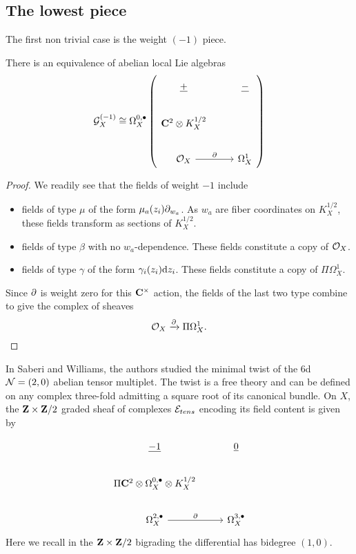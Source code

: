 \documentclass[../main.tex]{subfiles}
\begin{document}
\subsection{The lowest piece}

The first non trivial case is the weight $(-1)$ piece.

\begin{lem}
There is an equivalence of abelian local Lie algebras 
\[
\mc{G}_{X} ^{(-1)}\cong \Omega^{0,\bullet}_{X} \left ( 
\begin{tikzcd}
\ul{+} & \ul{-} \\
\C^2\otimes K^{1/2}_{X} & \\ 
\mc{O}_{X} \ar[r, "\del"] & \Omega^1_{X} 
\end{tikzcd}
\right )
\] 
\end{lem}
\begin{proof}
We readily see that the fields of weight $-1$ include
\begin{itemize}
\item 
fields of type $\mu$ of the form $\mu_a (z_i)\partial_{w_a}$. As $w_a$ are fiber coordinates on $K^{1/2}_{X}$, these fields transform as sections of $K^{1/2}_{X}$. 
\item 
fields of type $\beta$ with no $w_a$-dependence. These fields constitute a copy of $\mathcal{O}_{X}$.
\item 
fields of type $\gamma$ of the form $\gamma_i(z_i)\mathrm{d} z_i$. These fields constitute a copy of $\Pi \Omega^1_{X}$. 
\end{itemize}
Since $\partial$ is weight zero for this $\mathbf{C}^\times$ action, the fields of the last two type combine to give the complex of sheaves
\[
\mathcal{O}_{X}  \xrightarrow{\partial} \Pi \Omega^{1}_{X}  .
\]

\end{proof}

\parsec[]
In \cite{SWtensor} Saberi and Williams, the authors studied the minimal twist of the 6d $\mathcal{N}=(2,0)$ abelian tensor multiplet. The twist is a free theory and can be defined on any complex three-fold admitting a square root of its canonical bundle. On $X$, the $\mathbf{Z}\times \mathbf{Z}/2$ graded sheaf of complexes $\mathcal{E}_{tens}$ encoding its field content is given by 

\begin{equation}
\begin{tikzcd}
\ul{-1} & \ul{0} \\
\Pi \C^2\otimes \Omega^{0,\bullet}_{X} \otimes  K_{X}^{1/2}  & \\
\Omega^{2,\bullet}_{X} \ar[r,"\del"] & \Omega^{3,\bullet}_{X} 
\end{tikzcd} 
\end{equation}
Here we recall in the $\mathbf{Z} \times \mathbf{Z}/2$ bigrading the differential has bidegree $(1,0)$. 
\end{document}
